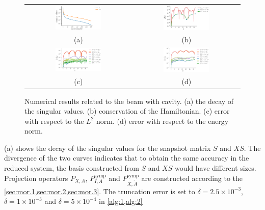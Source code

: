 \begin{figure} \label{fig:1.1}
\begin{tabular}{cc}
\includegraphics[width=0.45\textwidth]{./figs/beam_cracked/singulars} & \includegraphics[width=0.45\textwidth]{./figs/beam_cracked/energy} \\
(a) & (b) \\
\includegraphics[width=0.45\textwidth]{./figs/beam_cracked/l2} & \includegraphics[width=0.45\textwidth]{./figs/beam_cracked/energy_norm} \\
(c) & (d) \\
\end{tabular}
\caption{Numerical results related to the beam with cavity. (a) the decay of the singular values. (b) conservation of the Hamiltonian. (c) error with respect to the $L^2$ norm. (d) error with respect to the energy norm.}
\end{figure}

(a) shows the decay of the singular values for the snapshot matrix $S$ and $XS$. The divergence of the two curves indicates that to obtain the same accuracy in the reduced system, the basis constructed from $S$ and $XS$ would have different sizes.
Projection operators $P_{X,A}$, $P_{I,A}^{\text{symp}}$ and $P_{X,\tilde A}^{\text{symp}}$ are constructed according to the \cref{sec:mor.1,sec:mor.2,sec:mor.3}. The truncation error is set to $\delta = 2.5\times 10^{-3}$, 
$\delta = 1\times 10^{-3}$ and $\delta = 5\times 10^{-4}$ in \cref{alg:1,alg:2}

